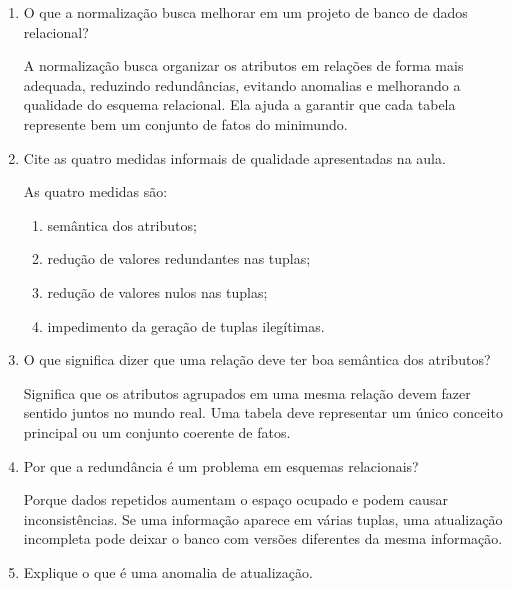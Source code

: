 \documentclass[12pt,a4paper]{article}
\begin{document}
\begin{enumerate}[label=\textbf{Q\arabic*.}]

\item O que a normalização busca melhorar em um projeto de banco de dados relacional?

\begin{resposta}
A normalização busca organizar os atributos em relações de forma mais adequada, reduzindo redundâncias, evitando anomalias e melhorando a qualidade do esquema relacional. Ela ajuda a garantir que cada tabela represente bem um conjunto de fatos do minimundo.
\end{resposta}

\item Cite as quatro medidas informais de qualidade apresentadas na aula.

\begin{resposta}
As quatro medidas são:
\begin{enumerate}
    \item semântica dos atributos;
    \item redução de valores redundantes nas tuplas;
    \item redução de valores nulos nas tuplas;
    \item impedimento da geração de tuplas ilegítimas.
\end{enumerate}
\end{resposta}

\item O que significa dizer que uma relação deve ter boa semântica dos atributos?

\begin{resposta}
Significa que os atributos agrupados em uma mesma relação devem fazer sentido juntos no mundo real. Uma tabela deve representar um único conceito principal ou um conjunto coerente de fatos.
\end{resposta}

\item Por que a redundância é um problema em esquemas relacionais?

\begin{resposta}
Porque dados repetidos aumentam o espaço ocupado e podem causar inconsistências. Se uma informação aparece em várias tuplas, uma atualização incompleta pode deixar o banco com versões diferentes da mesma informação.
\end{resposta}

\item Explique o que é uma anomalia de atualização.


\end{enumerate}
\end{document}
